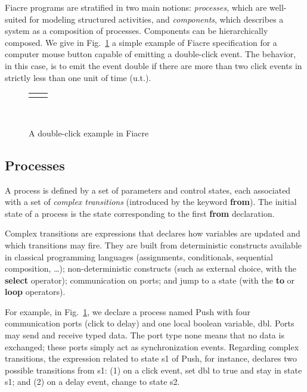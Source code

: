 \documentclass[a4paper]{scrartcl}
\def\code#1{\textsf{\small\bfseries #1}}
\def\vars#1{\textsf{\small #1}}
\begin{document}
Fiacre programs are stratified in two main notions: \emph{processes},
which are well-suited for modeling structured activities, and
\emph{components}, which describes a system as a composition of
processes. Components can be hierarchically composed. We give in
Fig.~\ref{fig/fiacre-process} a simple example of Fiacre specification
for a computer mouse button capable of emitting a double-click
event. The behavior, in this case, is to emit the event \vars{double}
if there are more than two \vars{click} events in {strictly less} than
one unit of time (u.t.).
\begin{figure}[tbh]
  \centering
  \begin{tabular}{c|@{\quad}c}
    \begin{minipage}[t]{0.42\linewidth}
      {}
    \end{minipage}
    &
    \begin{minipage}[t]{0.42\linewidth}
      {}
    \end{minipage}\\
  \end{tabular}\\
  \caption{A double-click example in Fiacre}
  \label{fig/fiacre-process}
\end{figure}



\subsection{Processes}
A process is defined by a set of parameters and {control states}, each
associated with a set of \emph{complex transitions} (introduced by the
keyword \code{from}). The initial state of a process is the state
corresponding to the first \code{from} declaration.

Complex transitions are expressions that declares how variables are
updated and which transitions may fire. They are built from
deterministic constructs available in classical programming languages
(assignments, conditionals, sequential composition, \dots);
non-deterministic constructs (such as external choice, with the
\code{select} operator); communication on ports; and jump to a state
(with the \code{to} or \code{loop} operators).

For example, in Fig.~\ref{fig/fiacre-process}, we declare a process
named \vars{Push} with four communication ports (\vars{click} to
\vars{delay}) and one local boolean variable, \vars{dbl}.  Ports may
send and receive typed data.  The port type \vars{none} means that no
data is exchanged; these ports simply act as synchronization
events. Regarding complex transitions, the expression related to state
\vars{s1} of \vars{Push}, for instance, declares two possible
transitions from \vars{s1}: (1) on a \vars{click} event, set
\vars{dbl} to true and stay in state \vars{s1}; and (2) on a
\vars{delay} event, change to state \vars{s2}.
\end{document}
